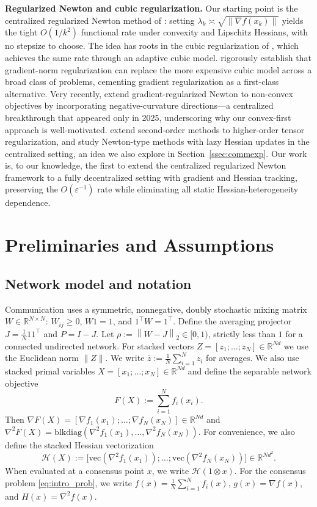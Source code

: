 \documentclass[10pt,twocolumn,letterpaper]{article}
\def\cO{O}%
\def\one{1}%
\def\J{J}%
\def\Pmat{P}%
\theoremstyle{compact}
\theoremstyle{compactremark}
\newcommand{\R}{\mathbb{R}}
\newcommand{\one}{\mathbf{1}}
\newcommand{\normtwo}[1]{\left\|#1\right\|_2}
\newcommand{\cO}{\mathcal{O}}
\newcommand{\J}{\left(\frac{1}{N}\one\one^\top\right)}
\newcommand{\Pmat}{I-\J}
\begin{document}
	\noindent\textbf{Regularized Newton and cubic regularization.}
	Our starting point is the centralized regularized Newton method
	of \citet{mishchenko2023rn}:
	setting $\lambda_k\asymp\sqrt{\|\nabla f(x_k)\|}$ yields the
	tight $\cO(1/k^2)$ functional rate under convexity and
	Lipschitz Hessians, with no stepsize to choose.
	The idea has roots in the cubic regularization of
	\citet{nesterov2006cubic,cartis2011arc}, which achieves the
	same rate through an adaptive cubic model.
	\citet{doikov2024gradient} rigorously establish
	that gradient-norm regularization can replace the more
	expensive cubic model across a broad class of problems,
	cementing gradient regularization as a first-class alternative.
	Very recently, \citet{ding2025nonconvex} extend gradient-regularized
	Newton to non-convex objectives by incorporating negative-curvature
	directions---a centralized breakthrough that appeared only in 2025,
	underscoring why our convex-first approach is well-motivated.
	\citet{doikov2021optimization} extend second-order methods to
	higher-order tensor regularization, and
	\citet{hanzely2022newton} study Newton-type methods with lazy
	Hessian updates in the centralized setting, an idea we also
	explore in Section~\ref{ssec:commexp}.
	Our work is, to our knowledge, the first to extend the
	centralized regularized Newton framework to a fully
	decentralized setting with gradient and Hessian tracking,
	preserving the $\cO(\varepsilon^{-1})$ rate while eliminating
	all static Hessian-heterogeneity dependence.
	
	\section{Preliminaries and Assumptions}\label{sec:prelim}
	\subsection{Network model and notation}
	Communication uses a symmetric, nonnegative, doubly stochastic mixing matrix $W\in\R^{N\times N}$:
	$W_{ij}\ge0$, $W\one=\one$, and $\one^\top W=\one^\top$.
	Define the averaging projector $\J=\frac{1}{N}\one\one^\top$ and $\Pmat=I-\J$.
	Let $\rho := \normtwo{W-\J}\in[0,1)$, strictly less than $1$ for a connected undirected network.
	For stacked vectors $Z=[z_1;\dots;z_N]\in\R^{Nd}$ we use the Euclidean norm $\|Z\|$.
	We write $\bar z:=\frac1N\sum_{i=1}^N z_i$ for averages.
	We also use stacked primal variables $X=[x_1;\dots;x_N]\in\R^{Nd}$ and define the separable network objective
	\[
	F(X):=\sum_{i=1}^N f_i(x_i).
	\]
	Then $\nabla F(X)=[\nabla f_1(x_1);\dots;\nabla f_N(x_N)]\in\R^{Nd}$ and
	$\nabla^2 F(X)=\mathrm{blkdiag}(\nabla^2 f_1(x_1),\dots,\nabla^2 f_N(x_N))$.
	For convenience, we also define the stacked Hessian vectorization
	\[
	\mathcal H(X):=\big[\mathrm{vec}(\nabla^2 f_1(x_1));\dots;\mathrm{vec}(\nabla^2 f_N(x_N))\big]\in\R^{Nd^2}.
	\]
	When evaluated at a consensus point $x$, we write $\mathcal H(\one\otimes x)$.
	For the consensus problem \eqref{eq:intro_prob}, we write
	$f(x)=\frac1N\sum_{i=1}^N f_i(x)$, $g(x)=\nabla f(x)$, and $H(x)=\nabla^2 f(x)$.
	
\end{document}
